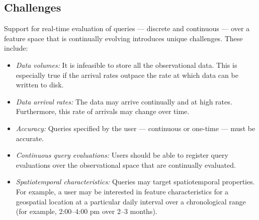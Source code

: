\subsection{Challenges}
Support for real-time evaluation of queries --– discrete and continuous --– over a feature space that is continually evolving introduces unique challenges. These include:
\begin{itemize}
    \item   \emph{Data volumes:} It is infeasible to store all the observational data. This is especially true if the arrival rates outpace the rate at which data can be written to disk.
    \item   \emph{Data arrival rates:} The data may arrive continually and at high rates. Furthermore, this rate of arrivals may change over time.
    \item   \emph{Accuracy:} Queries specified by the user --- continuous or one-time --- must be accurate.
    \item   \emph{Continuous query evaluations:} Users should be able to register query evaluations over the observational space that are continually evaluated.
    \item   \emph{Spatiotemporal characteristics:} Queries may target spatiotemporal properties. For example, a user may be interested in feature characteristics for a geospatial location at a particular daily interval over a chronological range (for example, 2:00--4:00 pm over 2--3 months).
\end{itemize}

